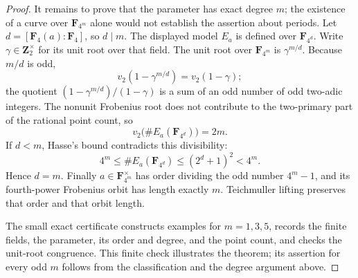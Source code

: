 \begin{proof}
It remains to prove that the parameter has exact degree $m$;
the existence of a curve over $\mathbf F_{4^m}$ alone would not
establish the assertion about periods. Let
$d=[\mathbf F_4(a):\mathbf F_4]$, so $d\mid m$. The displayed
model $E_a$ is defined over $\mathbf F_{4^d}$. Write
$\gamma\in\mathbf Z_2^\times$ for its unit root over that field.
The unit root over $\mathbf F_{4^m}$ is
$\gamma^{m/d}$. Because $m/d$ is odd,
\[
 v_2(1-\gamma^{m/d})=v_2(1-\gamma);
\]
the quotient $(1-\gamma^{m/d})/(1-\gamma)$ is a sum of an
odd number of odd two-adic integers. The nonunit Frobenius root
does not contribute to the two-primary part of the rational
point count, so
\[
             v_2\bigl(\#E_a(\mathbf F_{4^d})\bigr)=2m.
\]
If $d<m$, Hasse's bound contradicts this divisibility:
\[
 4^m\le\#E_a(\mathbf F_{4^d})
       \le(2^d+1)^2<4^m.
\]
Hence $d=m$. Finally $a\in\mathbf F_{4^m}^\times$ has order
dividing the odd number $4^m-1$, and its fourth-power Frobenius
orbit has length exactly $m$. Teichmuller lifting preserves that
order and that orbit length.

The small exact certificate
constructs examples for $m=1,3,5$, records the finite fields,
the parameter, its order and degree, and the point count, and
checks the unit-root congruence. This finite check illustrates
the theorem; its assertion for every odd $m$ follows from the
classification and the degree argument above.
\end{proof}
